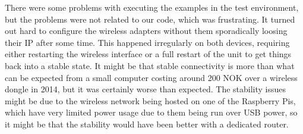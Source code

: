 There were some problems with executing the examples in the test environment, but the problems were not related to our code, which was frustrating. It turned out hard to configure the wireless adapters without them sporadically loosing their IP after some time. This happened irregularly on both devices, requiring either restarting the wireless interface or a full restart of the unit to get things back into a stable state. It might be that stable connectivity is more than what can be expected from a small computer costing around 200 NOK over a wireless dongle in 2014, but it was certainly worse than expected. The stability issues might be due to the wireless network being hosted on one of the Raspberry Pis, which have very limited power usage due to them being run over USB power, so it might be that the stability would have been better with a dedicated router.
